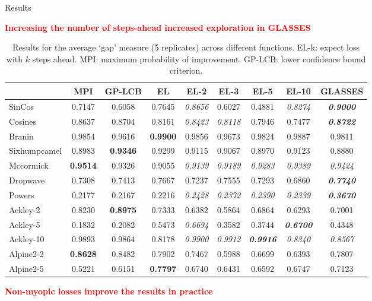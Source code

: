 \documentclass[15pt,serif,mathserif,final]{beamer}
\begin{document}
\begin{frame}{}
\begin{columns}[t]
\begin{column}{0.32\linewidth}
\begin{block}{Results}
 \begin{center}
 \textcolor{red}{\textbf{Increasing the number of steps-ahead increased exploration in GLASSES}}
 \end{center}
 

\begin{table}[t!]
\begin{center}
\begin{tabular}{lcccccccc}
\hline
{} &     MPI &     GP-LCB &      EL &    EL-2 &    EL-3 &    EL-5 &  EL-10 &    GLASSES \\
\hline
SinCos  &  0.7147 &  0.6058 &  0.7645 &  \emph{0.8656} &  0.6027 &  0.4881 &  \emph{0.8274} &  \emph{\textbf{0.9000}} \\ 
Cosines           &  0.8637 &  0.8704 &  0.8161 &  \emph{0.8423} &  \emph{0.8118} &  0.7946 &  0.7477 &  \emph{\textbf{0.8722}} \\
Branin              &  0.9854 &  0.9616 &  \textbf{0.9900} &  0.9856 &  0.9673 &  0.9824 &  0.9887 &  0.9811 \\
Sixhumpcamel        &  0.8983 &  \textbf{0.9346} &  0.9299 &  0.9115 &  0.9067 &  0.8970 &  0.9123 &  0.8880 \\
Mccormick           & \textbf{0.9514} &  0.9326 &  0.9055 &  \emph{0.9139} &  \emph{0.9189} &  \emph{0.9283} &  \emph{0.9389} &  \emph{0.9424} \\
Dropwave            &  0.7308 &  0.7413 &  0.7667 &  0.7237 &  0.7555 &  0.7293 &  0.6860 &  \emph{\textbf{0.7740}} \\
Powers              &  0.2177 &  0.2167 &  0.2216 &  \emph{0.2428} &  \emph{0.2372} &  \emph{0.2390} &  \emph{0.2339} &  \emph{\textbf{0.3670}} \\
Ackley-2 &  0.8230 &  \textbf{0.8975} &  0.7333 &  0.6382 &  0.5864 &  0.6864 &  0.6293 &  0.7001 \\
Ackley-5  & 0.1832&   0.2082&   0.5473&   \emph{0.6694}&  0.3582&   0.3744&   \emph{\textbf{0.6700}} &  0.4348\\ 
Ackley-10 &  0.9893 &  0.9864 &  0.8178 &   \emph{0.9900} &   \emph{0.9912} &   \emph{\textbf{0.9916}} &   \emph{0.8340} &   \emph{0.8567} \\
Alpine2-2 &  \textbf{0.8628} &  0.8482 &  0.7902 &  0.7467 &  0.5988 &  0.6699 &  0.6393 &  0.7807 \\
Alpine2-5  &  0.5221 &  0.6151 &  \textbf{0.7797} &  0.6740 &  0.6431 &  0.6592 &  0.6747 &  0.7123 \\
\hline
\end{tabular}\caption{Results for the average `gap' measure (5 replicates) across different functions.  EL-k: expect loss with $k$ steps ahead. MPI: maximum probability of improvement. GP-LCB: lower confidence bound criterion. }
\end{center}
\end{table}
 \begin{center}
 \textcolor{red}{\textbf{Non-myopic losses improve the results in practice }}
 \end{center}
 


\end{block}
\end{column}
\end{columns}
\end{frame}
\end{document}
